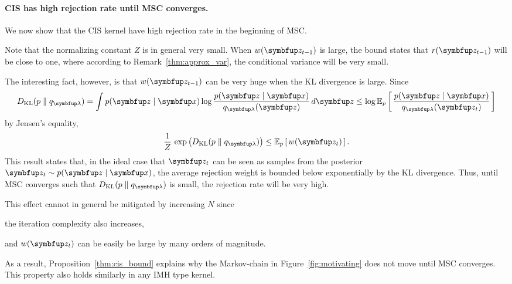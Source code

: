 \paragraph{CIS has high rejection rate until MSC converges.}
We now show that the CIS kernel have high rejection rate in the beginning of MSC.
%

%
Note that the normalizing constant \(Z\) is in general very small.
When \(w(\vz_{t-1})\) is large, the bound states that \(r(\vz_{t-1})\) will be close to one, where according to Remark~\ref{thm:approx_var}, the conditional variance will be very small.

The interesting fact, however, is that \(w(\vz_{t-1})\) can be very huge when the KL divergence is large.
Since
\begin{align}
  \DKL{p}{q_{\vlambda}} = \int p(\vz\mid\vx) \log \frac{p(\vz\mid\vx)}{q_{\vlambda}(\vz)} \, d\vz
  \leq \log \Esub{p}{\frac{p(\vz\mid\vx)}{q_{\vlambda}(\vz_t)}}
\end{align}
by Jensen's equality, 
\begin{align}
  \frac{1}{Z}\,\exp\big(\DKL{p}{q_{\vlambda}}\big) \leq \Esub{p}{w(\vz_{t})}.
\end{align}
This result states that, in the ideal case that \(\vz_t\) can be seen as samples from the posterior \(\vz_t \sim p(\vz\mid\vx)\), the average rejection weight is bounded below exponentially by the KL divergence.
Thus, until MSC converges such that \(\DKL{p}{q_{\vlambda}}\) is small, the rejection rate will be very high.

This effect cannot in general be mitigated by increasing \(N\) since
\begin{enumerate*}[label=(\roman*)]
  \item the iteration complexity also increases,
  \item and \(w(\vz_t)\) can be easily be large by many orders of magnitude.
\end{enumerate*}
As a result, Proposition~\ref{thm:cis_bound} explains why the Markov-chain in Figure~\ref{fig:motivating} does not move until MSC converges.
This property also holds similarly in any IMH type kernel.


